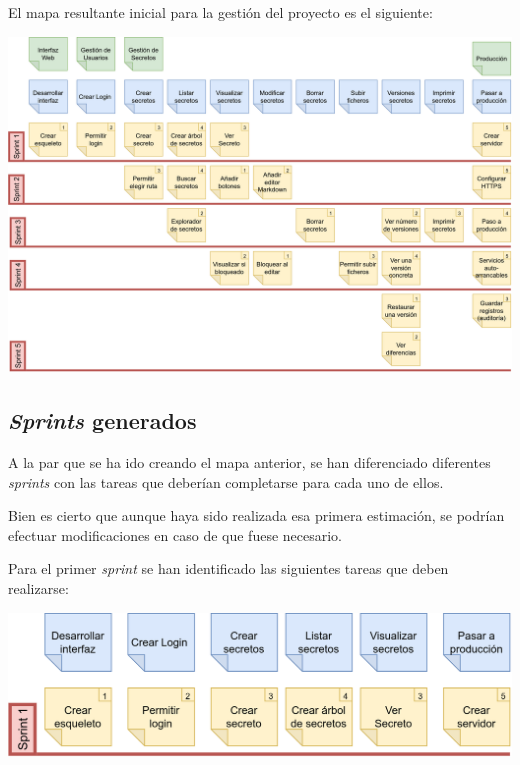 \documentclass{\ClassPath/viu-tfm-template}
\begin{document}
El mapa resultante inicial para la gestión del proyecto es el siguiente:

\begin{center}
    \includegraphics[width=\linewidth]{img/kanban.png}
\end{center}

\subsection{\textit{Sprints} generados}

A la par que se ha ido creando el mapa anterior, se han diferenciado diferentes \textit{sprints} con las tareas que deberían completarse para cada uno de ellos.

Bien es cierto que aunque haya sido realizada esa primera estimación, se podrían efectuar modificaciones en caso de que fuese necesario.

Para el primer \textit{sprint} se han identificado las siguientes tareas que deben realizarse:

\begin{center}
    \includegraphics[width=\linewidth]{img/sprint1.png}
\end{center}
\end{document}
